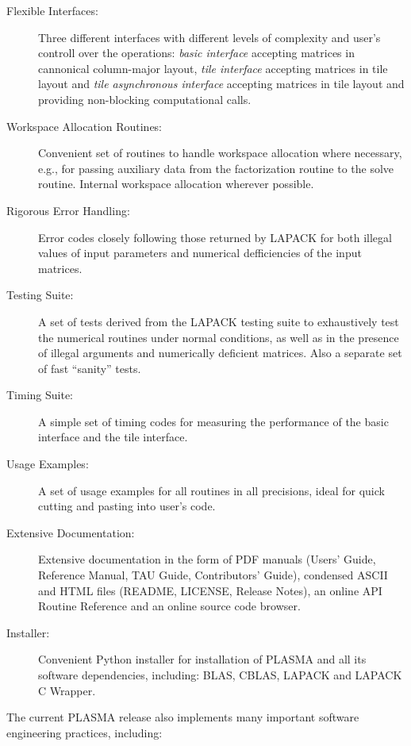 \begin{description}
\item[Flexible Interfaces:]
Three different interfaces with different levels of complexity and user's controll over the
operations: {\em basic interface} accepting matrices in cannonical \mbox{column-major} layout,
{\em tile interface} accepting matrices in tile layout and {\em tile asynchronous interface}
accepting matrices in tile layout and providing \mbox{non-blocking} computational calls.

\item[Workspace Allocation Routines:]
Convenient set of routines to handle workspace allocation where necessary, e.g., for passing
auxiliary data from the factorization routine to the solve routine.
Internal workspace allocation wherever possible.

\item[Rigorous Error Handling:]
Error codes closely following those returned by LAPACK for both illegal values of input
parameters and numerical defficiencies of the input matrices.

\item[Testing Suite:]
A set of tests derived from the LAPACK testing suite to exhaustively test the numerical routines
under normal conditions, as well as in the presence of illegal arguments and numerically deficient
matrices. Also a separate set of fast ``sanity'' tests.

\item[Timing Suite:]
A simple set of timing codes for measuring the performance of the basic interface and the tile
interface.

\item[Usage Examples:]
A set of usage examples for all routines in all precisions, ideal for quick cutting and pasting
into user's code.

\item[Extensive Documentation:]
Extensive documentation in the form of PDF manuals (Users' Guide, Reference Manual, TAU Guide,
Contributors' Guide), condensed ASCII and HTML files (README, LICENSE, Release Notes), an online
API Routine Reference and an online source code browser.

\item[Installer:]
Convenient Python installer for installation of PLASMA and all its software dependencies,
including: BLAS, CBLAS, LAPACK and LAPACK C Wrapper.
\end{description}

The current PLASMA release also implements many important software engineering practices,
including:

